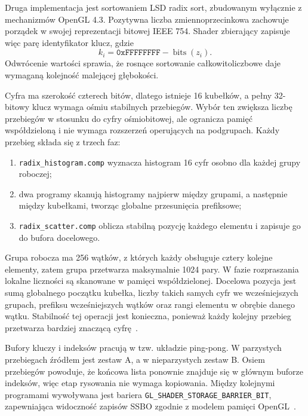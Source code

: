 Druga implementacja jest sortowaniem LSD radix sort, zbudowanym wyłącznie z mechanizmów OpenGL 4.3. Pozytywna liczba zmiennoprzecinkowa zachowuje porządek w swojej reprezentacji bitowej IEEE 754. Shader zbierający zapisuje więc parę identyfikator \- klucz, gdzie
\begin{equation}
  k_i=\mathtt{0xFFFFFFFF}-\operatorname{bits}(z_i).
  \label{eq:impl_radix_key}
\end{equation}
Odwrócenie wartości sprawia, że rosnące sortowanie całkowitoliczbowe daje wymaganą kolejność malejącej głębokości.

Cyfra ma szerokość czterech bitów, dlatego istnieje 16 kubełków, a pełny 32-bitowy klucz wymaga ośmiu stabilnych przebiegów. Wybór ten zwiększa liczbę przebiegów w stosunku do cyfry ośmiobitowej, ale ogranicza pamięć współdzieloną i nie wymaga rozszerzeń operujących na podgrupach. Każdy przebieg składa się z trzech faz:
\begin{enumerate}
  \item \texttt{radix\_histogram.comp} wyznacza histogram 16 cyfr osobno
    dla każdej grupy roboczej;
  \item dwa programy skanują histogramy najpierw między grupami, a następnie
    między kubełkami, tworząc globalne przesunięcia prefiksowe;
  \item \texttt{radix\_scatter.comp} oblicza stabilną pozycję każdego
    elementu i zapisuje go do bufora docelowego.
\end{enumerate}

Grupa robocza ma 256 wątków, z których każdy obsługuje cztery kolejne elementy, zatem grupa przetwarza maksymalnie 1024 pary. W fazie rozpraszania lokalne liczności są skanowane w pamięci współdzielonej. Docelowa pozycja jest sumą globalnego początku kubełka, liczby takich samych cyfr we wcześniejszych grupach, prefiksu wcześniejszych wątków oraz rangi elementu w obrębie danego wątku. Stabilność tej operacji jest konieczna, ponieważ każdy kolejny przebieg przetwarza bardziej znaczącą cyfrę~\cite{satish2009sorting}.

Bufory kluczy i indeksów pracują w tzw. układzie ping-pong. W parzystych przebiegach źródłem jest zestaw A, a w nieparzystych zestaw B. Osiem przebiegów powoduje, że końcowa lista ponownie znajduje się w głównym buforze indeksów, więc etap rysowania nie wymaga kopiowania. Między kolejnymi programami wywoływana jest bariera \texttt{GL\_SHADER\_STORAGE\_BARRIER\_BIT}, zapewniająca widoczność zapisów SSBO zgodnie z modelem pamięci OpenGL~\cite{khronos2013opengl43}.

